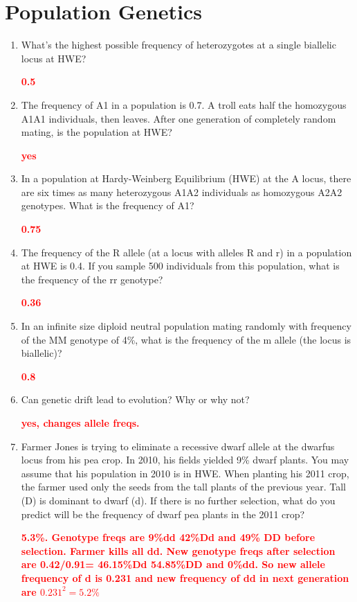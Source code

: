 \documentclass[]{article}
\newcommand{\answer}[1]{\textcolor{red}{\bf #1}}
\begin{document}
\section*{Population Genetics}

\begin{enumerate}
\item What’s the highest possible frequency of heterozygotes at a single biallelic locus at HWE?

\answer{0.5}
\item The frequency of A1 in a population is 0.7.  A troll eats half the homozygous A1A1 individuals, then leaves.  After one generation of completely random mating, is the population at HWE?

\answer{yes}
\item  In a population at Hardy-Weinberg Equilibrium (HWE) at the A locus, there are six times as many heterozygous A1A2 individuals as homozygous A2A2 genotypes.  What is the frequency of A1?

\answer{0.75}
\item The frequency of the R allele (at a locus with alleles R and r) in a population at HWE is 0.4.  If you sample 500 individuals from this population, what is the frequency of the rr genotype? 

\answer{0.36}
\item  In an infinite size diploid neutral population mating randomly with frequency of the MM genotype of 4\%, what is the frequency of the m allele (the locus is biallelic)?


\answer{0.8}
\item  Can genetic drift lead to evolution?  Why or why not?

\answer{yes, changes allele freqs.}

\item Farmer Jones is trying to eliminate a recessive dwarf allele at the dwarfus locus from his pea crop. In 2010, his fields yielded 9\% dwarf plants. You may assume that his population in 2010 is in HWE. When planting his 2011 crop, the farmer used only the seeds from the tall plants of the previous year. Tall (D) is dominant to dwarf (d). If there is no further selection, what do you predict will be the frequency of dwarf pea plants in the 2011 crop?

\answer{5.3\%. Genotype freqs are 9\%dd 42\%Dd and 49\% DD before selection. Farmer kills all dd. New genotype freqs after selection are 0.42/0.91= 46.15\%Dd 54.85\%DD and 0\%dd. So new allele frequency of d is 0.231 and new frequency of dd in next generation are $0.231^2=5.2\%$}

\end{enumerate}
\end{document}
